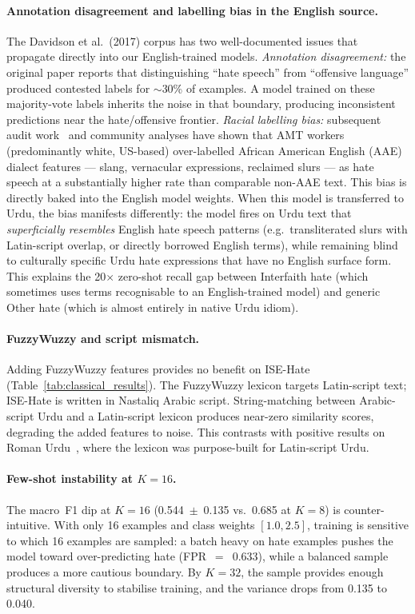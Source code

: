 \documentclass{article}
\begin{document}
\paragraph{Annotation disagreement and labelling bias in the English source.}
The Davidson et al.\ (2017) corpus has two well-documented issues that
propagate directly into our English-trained models.
\textit{Annotation disagreement:} the original paper reports that
distinguishing ``hate speech'' from ``offensive language'' produced
contested labels for $\sim$30\% of examples.
A model trained on these majority-vote labels inherits the noise in that
boundary, producing inconsistent predictions near the hate/offensive
frontier.
\textit{Racial labelling bias:} subsequent audit work~\citep{davidson2017automated}
and community analyses have shown that AMT workers (predominantly
white, US-based) over-labelled African American English (AAE) dialect
features --- slang, vernacular expressions, reclaimed slurs --- as hate
speech at a substantially higher rate than comparable non-AAE text.
This bias is directly baked into the English model weights.
When this model is transferred to Urdu, the bias manifests differently:
the model fires on Urdu text that \emph{superficially resembles}
English hate speech patterns (e.g.\ transliterated slurs with Latin-script
overlap, or directly borrowed English terms), while remaining blind to
culturally specific Urdu hate expressions that have no English surface form.
This explains the 20$\times$ zero-shot recall gap between Interfaith hate
(which sometimes uses terms recognisable to an English-trained model)
and generic Other hate (which is almost entirely in native Urdu idiom).

\paragraph{FuzzyWuzzy and script mismatch.}
Adding FuzzyWuzzy features provides no benefit on ISE-Hate
(Table~\ref{tab:classical_results}).
The FuzzyWuzzy lexicon targets Latin-script text;
ISE-Hate is written in Nastaliq Arabic script.
String-matching between Arabic-script Urdu and a Latin-script lexicon
produces near-zero similarity scores, degrading the added features to noise.
This contrasts with positive results on Roman Urdu~\citep{ullah2024fuzzy},
where the lexicon was purpose-built for Latin-script Urdu.

\paragraph{Few-shot instability at $K=16$.}
The macro~F1 dip at $K=16$ (0.544~$\pm$~0.135 vs.\ 0.685 at $K=8$) is
counter-intuitive.
With only 16 examples and class weights $[1.0, 2.5]$, training is
sensitive to which 16 examples are sampled: a batch heavy on hate examples
pushes the model toward over-predicting hate (FPR~$=$~0.633), while a
balanced sample produces a more cautious boundary.
By $K=32$, the sample provides enough structural diversity to stabilise
training, and the variance drops from 0.135 to 0.040.
\end{document}
